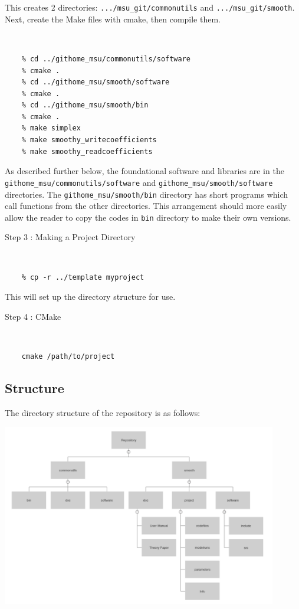 \documentclass[12pt]{article}
\numberwithin{equation}{section}
\numberwithin{figure}{section}
\begin{document}
This creates 2 directories: {\tt .../msu\_git/commonutils} and {\tt .../msu\_git/smooth}. Next, create the Make files with cmake, then compile them.
{\tt 
\begin{verbatim}
    % cd ../githome_msu/commonutils/software
    % cmake .
    % cd ../githome_msu/smooth/software
    % cmake .
    % cd ../githome_msu/smooth/bin
    % cmake .
    % make simplex
    % make smoothy_writecoefficients
    % make smoothy_readcoefficients
\end{verbatim}
}
As described further below, the foundational software and libraries are in the {\tt githome\_msu/commonutils/software} and {\tt githome\_msu/smooth/software} directories. The {\tt githome\_msu/smooth/bin} directory has short programs which call functions from the other directories. This arrangement should more easily allow the reader to copy the codes in {\tt bin} directory to make their own versions.

\begin{description}
\item[Step 3 : Making a Project Directory] 
\end{description}
{\tt 
\begin{verbatim}
    % cp -r ../template myproject
\end{verbatim}
}
     
This will set up the directory structure for use.  \\ 

\begin{description}
\item[Step 4 : CMake]
\end{description}

{\tt 
\begin{verbatim}
    cmake /path/to/project
\end{verbatim}
}

\subsection{Structure}

The directory structure of the repository is as follows: 

\includegraphics[width = 120mm]{Structure_Tree.png}
\end{document}
